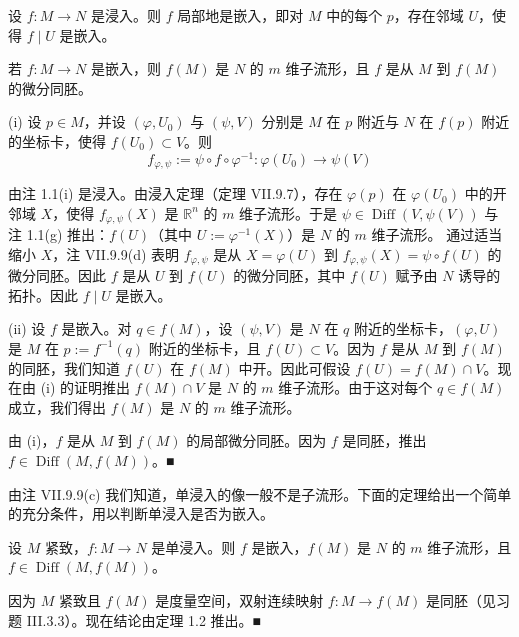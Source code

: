 \begin{theorem}

\begin{subitems}
\item

设 $ f:M\to N $ 是浸入。则 $ f $ 局部地是嵌入，即对 $ M $ 中的每个 $ p $，存在邻域 $ U $，使得 $ f\mid U $ 是嵌入。

\item

若 $ f:M\to N $ 是嵌入，则 $ f(M) $ 是 $ N $ 的 $ m $ 维子流形，且 $ f $ 是从 $ M $ 到 $ f(M) $ 的微分同胚。

\proofhead
(i) 设 $ p\in M $，并设 $ (\varphi,U_0) $ 与 $ (\psi,V) $ 分别是 $ M $ 在 $ p $ 附近与 $ N $ 在 $ f(p) $ 附近的坐标卡，使得 $ f(U_0)\subset V $。则
\[
f_{\varphi,\psi}:=\psi\circ f\circ\varphi^{-1}:\varphi(U_0)\to\psi(V)
\]

由注 1.1(i) 是浸入。由浸入定理（定理 VII.9.7），存在 $ \varphi(p) $ 在 $ \varphi(U_0) $ 中的开邻域 $ X $，使得 $ f_{\varphi,\psi}(X) $ 是 $ \mathbb{R}^n $ 的 $ m $ 维子流形。于是 $ \psi\in\operatorname{Diff}(V,\psi(V)) $ 与注 1.1(g) 推出：$ f(U) $（其中 $ U:=\varphi^{-1}(X) $）是 $ N $ 的 $ m $ 维子流形。
通过适当缩小 $ X $，注 VII.9.9(d) 表明 $ f_{\varphi,\psi} $ 是从 $ X=\varphi(U) $ 到 $ f_{\varphi,\psi}(X)=\psi\circ f(U) $ 的微分同胚。因此 $ f $ 是从 $ U $ 到 $ f(U) $ 的微分同胚，其中 $ f(U) $ 赋予由 $ N $ 诱导的拓扑。因此 $ f\mid U $ 是嵌入。

\end{subitems}

(ii) 设 $ f $ 是嵌入。对 $ q\in f(M) $，设 $ (\psi,V) $ 是 $ N $ 在 $ q $ 附近的坐标卡，$ (\varphi,U) $ 是 $ M $ 在 $ p:=f^{-1}(q) $ 附近的坐标卡，且 $ f(U)\subset V $。因为 $ f $ 是从 $ M $ 到 $ f(M) $ 的同胚，我们知道 $ f(U) $ 在 $ f(M) $ 中开。因此可假设 $ f(U)=f(M)\cap V $。现在由 (i) 的证明推出 $ f(M)\cap V $ 是 $ N $ 的 $ m $ 维子流形。由于这对每个 $ q\in f(M) $ 成立，我们得出 $ f(M) $ 是 $ N $ 的 $ m $ 维子流形。

由 (i)，$ f $ 是从 $ M $ 到 $ f(M) $ 的局部微分同胚。因为 $ f $ 是同胚，推出 $ f\in\operatorname{Diff}(M,f(M)) $。\nobreak\hspace{0.35em}■

\end{theorem}

由注 VII.9.9(c) 我们知道，单浸入的像一般不是子流形。下面的定理给出一个简单的充分条件，用以判断单浸入是否为嵌入。

\begin{theorem}

设 $ M $ 紧致，$ f:M\to N $ 是单浸入。则 $ f $ 是嵌入，$ f(M) $ 是 $ N $ 的 $ m $ 维子流形，且 $ f\in\operatorname{Diff}(M,f(M)) $。

\proofhead
因为 $ M $ 紧致且 $ f(M) $ 是度量空间，双射连续映射 $ f:M\to f(M) $ 是同胚（见习题 III.3.3）。现在结论由定理 1.2 推出。\nobreak\hspace{0.35em}■
\end{theorem}

